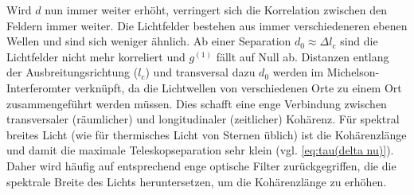 Wird $d$ nun immer weiter erhöht, verringert sich die Korrelation zwischen den Feldern immer weiter. 
Die Lichtfelder bestehen aus immer verschiedeneren ebenen Wellen und sind sich weniger ähnlich. 
Ab einer Separation $d_0 \approx \Delta l_\mathrm{c}$ sind die Lichtfelder nicht mehr korreliert und $g^{(1)}$ fällt auf Null ab. 
Distanzen entlang der Ausbreitungsrichtung ($l_\mathrm{c}$) und transversal dazu $d_0$ werden im Michelson-Interferomter verknüpft, da die Lichtwellen von verschiedenen Orte zu einem Ort zusammengeführt werden müssen.
Dies schafft eine enge Verbindung zwischen transversaler (räumlicher) und longitudinaler (zeitlicher) Kohärenz.  
Für spektral breites Licht (wie für thermisches Licht von Sternen üblich) ist die Kohärenzlänge und damit die maximale Teleskopseparation sehr klein (vgl. \autoref{eq:tau(delta nu)}). 
Daher wird häufig auf entsprechend enge optische Filter zurückgegriffen, die die spektrale Breite des Lichts heruntersetzen, um die Kohärenzlänge zu erhöhen. \\


